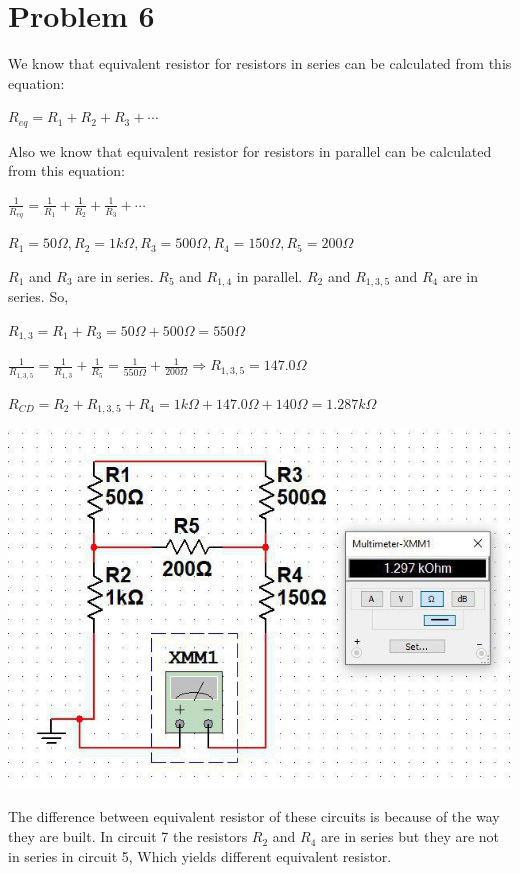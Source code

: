 \documentclass{report}
\begin{document}
    \section*{Problem 6}
    {
        We know that equivalent resistor for resistors in series can be calculated from this equation:
        \begin{center}
            $R_{eq} = R_1 + R_2 + R_3 + \cdots$
        \end{center}

        Also we know that equivalent resistor for resistors in parallel can be calculated from this equation:
        \begin{center}
            $\frac{1}{R_{eq}} = \frac{1}{R_1} + \frac{1}{R_2} + \frac{1}{R_3} + \cdots$
        \end{center}

        $R_1 = 50\Omega, R_2 = 1k\Omega, R_3 = 500\Omega, R_4 = 150\Omega, R_5 = 200\Omega$

        $R_1$ and $R_3$ are in series.
        $R_5$ and $R_{1,4}$ in parallel.
        $R_2$ and $R_{1,3,5}$ and $R_4$ are in series.
        So,

        $R_{1, 3} = R_1 + R_3 = 50\Omega + 500\Omega = 550\Omega$

        $\frac{1}{R_{1, 3, 5}} = \frac{1}{R_{1, 3}} + \frac{1}{R_5} = \frac{1}{550\Omega} + \frac{1}{200\Omega} \Rightarrow R_{1, 3, 5} = 147.0\Omega$

        $R_{CD} = R_2 + R_{1,3,5} + R_4 = 1k\Omega + 147.0\Omega + 140\Omega = \boxed{1.287k\Omega}$

            \begin{center}
                \includegraphics[width=0.5\linewidth]{problem6.jpg}
            \end{center}

            The difference between equivalent resistor of these circuits is because of the way they are built.
            In circuit 7 the resistors $R_2$ and $R_4$ are in series but they are not in series in circuit 5,
            Which yields different equivalent resistor.
    }
\end{document}
